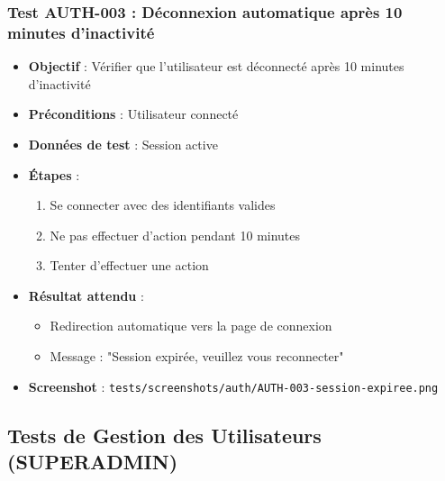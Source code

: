 \subsubsection{Test AUTH-003 : Déconnexion automatique après 10 minutes d'inactivité}
\begin{itemize}
    \item \textbf{Objectif} : Vérifier que l'utilisateur est déconnecté après 10 minutes d'inactivité
    \item \textbf{Préconditions} : Utilisateur connecté
    \item \textbf{Données de test} : Session active
    \item \textbf{Étapes} :
        \begin{enumerate}
            \item Se connecter avec des identifiants valides
            \item Ne pas effectuer d'action pendant 10 minutes
            \item Tenter d'effectuer une action
        \end{enumerate}
    \item \textbf{Résultat attendu} : 
        \begin{itemize}
            \item Redirection automatique vers la page de connexion
            \item Message : "Session expirée, veuillez vous reconnecter"
        \end{itemize}
    \item \textbf{Screenshot} : \texttt{tests/screenshots/auth/AUTH-003-session-expiree.png}
\end{itemize}

\subsection{Tests de Gestion des Utilisateurs (SUPERADMIN)}

